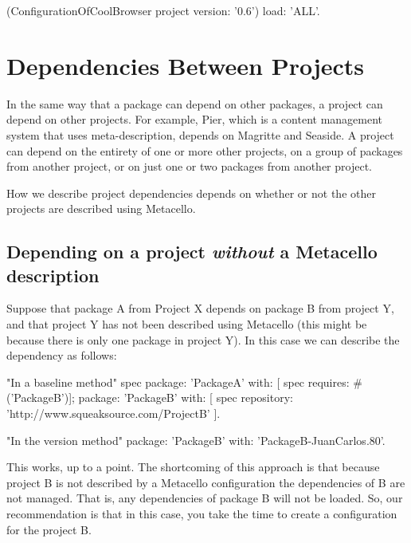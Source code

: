 \documentclass[a4paper,10pt,twoside]{book}
\begin{document}
\begin{code}{}
(ConfigurationOfCoolBrowser project version: '0.6') load: 'ALL'.
\end{code}
 

\section{Dependencies Between Projects}

In the same way that a package can depend on other packages, a project can depend on other projects.  For example, Pier, which is a content management system that uses meta-description, depends on Magritte and Seaside.  A project can depend on the entirety of one or more other projects, on a group of packages from another project, or on just one or two packages from another project.

How we describe project dependencies depends on whether or not the other projects are described using Metacello. 

\subsection{Depending on a project \emph{without} a Metacello description}

Suppose that package A from Project X depends on package B from project Y, and that project Y has not been described using Metacello (this might be because there is only one package in project Y). 
In this case we can describe the dependency as follows:

\begin{code}{}
      "In a baseline method"
      spec 
             package: 'PackageA' with: [  spec requires: #('PackageB')];
             package: 'PackageB' with: [  spec 
                   repository: 'http://www.squeaksource.com/ProjectB' ].       
\end{code}

\begin{code}{}
      "In the version method"
      package: 'PackageB' with: 'PackageB-JuanCarlos.80'.
\end{code}

This works, up to a point.  The shortcoming of this approach is that because  project B is not described by a Metacello configuration the dependencies of B are not managed. 
That is, any dependencies of package B will not be loaded. So, our recommendation is that in this case, you take the time to create a configuration for the project B.
\end{document}
